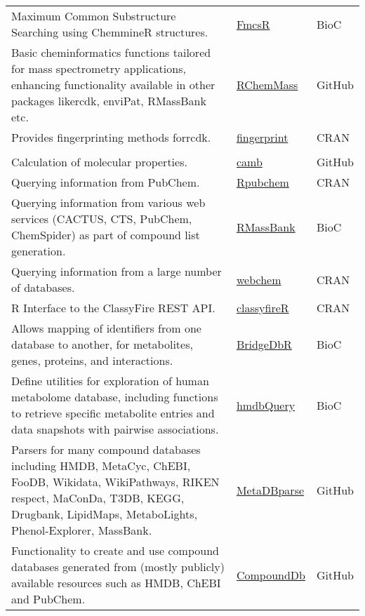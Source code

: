 \documentclass[]{article}
\begin{document}
\begin{longtable}[t]{>{\raggedright\arraybackslash}p{30em}>{\raggedright\arraybackslash}p{10em}>{\raggedright\arraybackslash}p{3em}}
Maximum Common Substructure Searching using ChemmineR structures. & \href{https://doi.org/doi:10.18129/B9.bioc.fmcsR}{FmcsR} & BioC\\
\rowcolor{gray!6}  Basic cheminformatics functions tailored for mass spectrometry applications, enhancing functionality available in other packages likercdk, enviPat, RMassBank etc. & \href{https://github.com/schymane/RChemMass}{RChemMass} & GitHub\\
Provides fingerprinting methods forrcdk. & \href{https://cran.r-project.org/package=fingerprint}{fingerprint} & CRAN\\
\rowcolor{gray!6}  \addlinespace[0.3em]
\multicolumn{3}{l}{\textbf{Database queries}}\\
Calculation of molecular properties. & \href{https://github.com/cambDI/camb}{camb} & GitHub\\
Querying information from PubChem. & \href{https://cran.r-project.org/package=rpubchem}{Rpubchem} & CRAN\\
\rowcolor{gray!6}  Querying information from various web services (CACTUS, CTS, PubChem, ChemSpider) as part of compound list generation. & \href{https://doi.org/doi:10.18129/B9.bioc.RMassBank}{RMassBank} & BioC\\
Querying information from a large number of databases. & \href{https://cran.r-project.org/package=webchem}{webchem} & CRAN\\
\rowcolor{gray!6}  R Interface to the ClassyFire REST API. & \href{https://cran.r-project.org/web/packages/classyfireR/index.html}{classyfireR} & CRAN\\
Allows mapping of identifiers from one database to another, for metabolites, genes, proteins, and interactions. & \href{https://doi.org/10.18129/B9.bioc.BridgeDbR}{BridgeDbR} & BioC\\
\rowcolor{gray!6}  Define utilities for exploration of human metabolome database, including functions to retrieve specific metabolite entries and data snapshots with pairwise associations. & \href{https://doi.org/doi:10.18129/B9.bioc.hmdbQuery}{hmdbQuery} & BioC\\
Parsers for many compound databases including HMDB, MetaCyc, ChEBI, FooDB, Wikidata, WikiPathways, RIKEN respect, MaConDa, T3DB, KEGG, Drugbank, LipidMaps, MetaboLights, Phenol-Explorer, MassBank. & \href{https://github.com/UMCUGenetics/MetaDBparse}{MetaDBparse} & GitHub\\
\rowcolor{gray!6}  Functionality to create and use compound databases generated from (mostly publicly) available resources such as HMDB, ChEBI and PubChem. & \href{https://github.com/EuracBiomedicalResearch/CompoundDb}{CompoundDb} & GitHub\\

\end{longtable}
\end{document}
